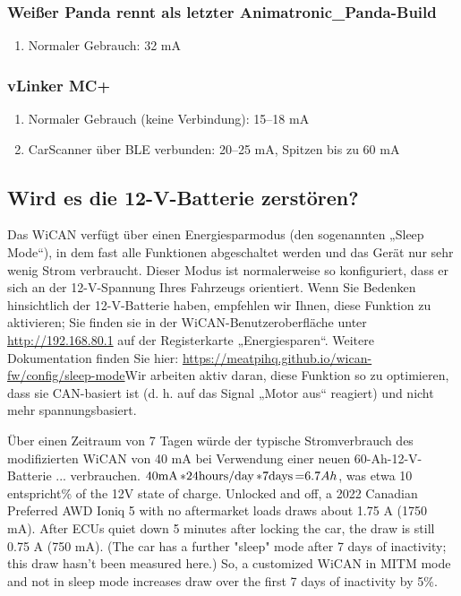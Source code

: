 \documentclass[superscriptaddress,onecolumn,floatfix]{revtex4-2}
\begin{document}
\subsubsection{Weißer Panda rennt als letzter Animatronic\_Panda-Build}
\begin{enumerate}
  \item{Normaler Gebrauch:} 32 mA
\end{enumerate}

\subsubsection{vLinker MC+}
\begin{enumerate}
  \item{Normaler Gebrauch (keine Verbindung):} 15–18 mA
  \item{CarScanner über BLE verbunden:} 20–25 mA, Spitzen bis zu 60 mA
\end{enumerate}

\subsection{Wird es die 12-V-Batterie zerstören?}

Das WiCAN verfügt über einen Energiesparmodus (den sogenannten „Sleep Mode“), in dem fast alle Funktionen abgeschaltet werden und das Gerät nur sehr wenig Strom verbraucht. Dieser Modus ist normalerweise so konfiguriert, dass er sich an der 12-V-Spannung Ihres Fahrzeugs orientiert. Wenn Sie Bedenken hinsichtlich der 12-V-Batterie haben, empfehlen wir Ihnen, diese Funktion zu aktivieren; Sie finden sie in der WiCAN-Benutzeroberfläche unter \href{http://192.168.80.1}{http://192.168.80.1} auf der Registerkarte „Energiesparen“. Weitere Dokumentation finden Sie hier: \href{https://meatpihq.github.io/wican-fw/config/sleep-mode}{https://meatpihq.github.io/wican-fw/config/sleep-mode}Wir arbeiten aktiv daran, diese Funktion so zu optimieren, dass sie CAN-basiert ist (d. h. auf das Signal „Motor aus“ reagiert) und nicht mehr spannungsbasiert. 

Über einen Zeitraum von 7 Tagen würde der typische Stromverbrauch des modifizierten WiCAN von 40 mA bei Verwendung einer neuen 60-Ah-12-V-Batterie ... verbrauchen. $40 \unit[\mathrm{mA}] * 24 \unit[\mathrm{hours/day}] * 7 \unit[\mathrm{days}] = 6.7 Ah$, was etwa 10 entspricht\% of the 12V state of charge. Unlocked and off, a 2022 Canadian Preferred AWD Ioniq 5 with no aftermarket loads draws about 1.75 A (1750 mA). After ECUs quiet down 5 minutes after locking the car, the draw is still 0.75 A (750 mA). (The car has a further "sleep" mode after 7 days of inactivity; this draw hasn't been measured here.) So, a customized WiCAN in MITM mode and not in sleep mode increases draw over the first 7 days of inactivity by 5\%.
\end{document}
